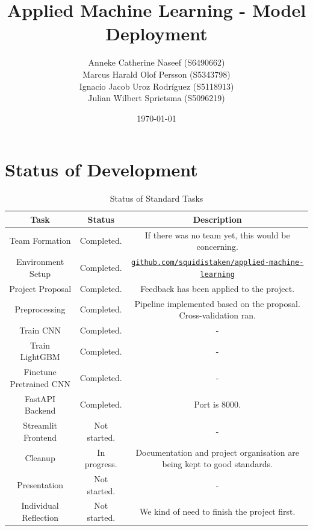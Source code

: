 \documentclass{article}
\title{\textbf{Applied Machine Learning - Model Deployment}}
\author{
        Anneke Catherine Naseef (S6490662) \\
        Marcus Harald Olof Persson (S5343798) \\
        Ignacio Jacob Uroz Rodríguez (S5118913) \\
        Julian Wilbert Sprietsma (S5096219) \\
}
\date{\today}
\begin{document}
\maketitle

\section{Status of Development}

\begin{table}[!h]
    \centering
    \begin{tabular}{|c|c|c|}
        \hline
        \textbf{Task} & \textbf{Status} & \textbf{Description} \\
        \hline
        \hline
        Team Formation & Completed. & If there was no team yet, this would be concerning. \\
        \hline
        Environment Setup & Completed. & \href{https://github.com/squidistaken/applied-machine-learning}{\texttt{github.com/squidistaken/applied-machine-learning}} \\
        \hline
        Project Proposal & Completed. & Feedback has been applied to the project. \\
        \hline
        Preprocessing & Completed. & Pipeline implemented based on the proposal. Cross-validation ran. \\
        \hline
        Train CNN & Completed. & - \\
        \hline
        Train LightGBM & Completed. & - \\
        \hline
        Finetune Pretrained CNN & Completed. & - \\
        \hline
        FastAPI Backend & Completed. & Port is 8000. \\
        \hline
        Streamlit Frontend & Not started. & - \\
        \hline
        Cleanup & In progress. & Documentation and project organisation are being kept to good standards. \\
        \hline
        Presentation & Not started. & - \\
        \hline
        Individual Reflection & Not started. & We kind of need to finish the project first. \\
        \hline
    \end{tabular}
    \caption{Status of Standard Tasks}
    \label{tab:status_standard}
\end{table}
\end{document}
